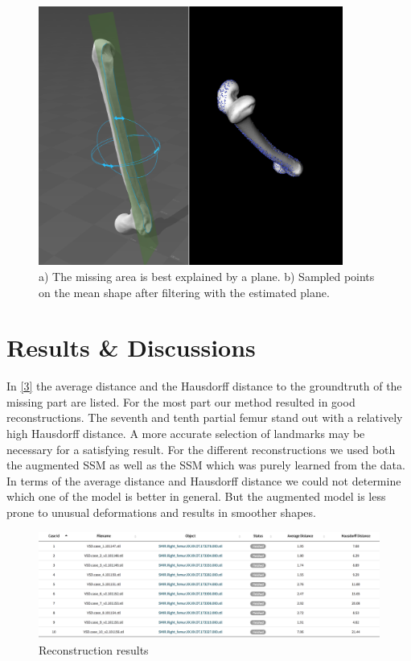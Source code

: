 \documentclass{article}
\begin{document}
	
	\begin{figure}
	\centering
	\includegraphics[width=10cm]{4.png}
	 \caption{ a) The missing area is best explained by a plane. 
	 	b) Sampled points on the mean shape after filtering with the estimated plane.}
	 \label{2}
	\end{figure}
	
	



	
	\section{Results \& Discussions}
	
	In \autoref{3} the average distance and the Hausdorff distance to the groundtruth of the missing part are listed. For the most part our method resulted in good reconstructions. The seventh and tenth partial femur stand out with a relatively high Hausdorff distance. A more accurate selection of landmarks may be necessary for a satisfying result. 
	For the different reconstructions we used both the augmented SSM as well as the SSM which was purely learned from the data. In terms of the average distance and Hausdorff distance we could not determine which one of the model is better in general. But the augmented model is less prone to unusual deformations and results in smoother shapes.
	\begin{figure}
		\centering
		\includegraphics[width=15cm]{3.png}
		\caption{Reconstruction results}
		\label{3}
	\end{figure}
\end{document}
